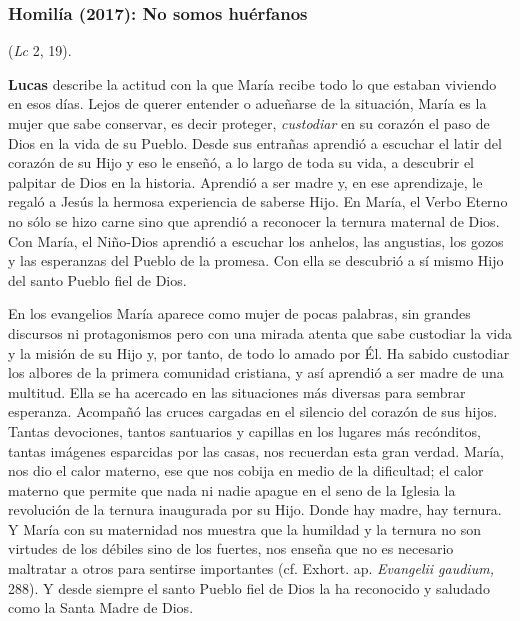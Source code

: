 \subsubsection{Homilía (2017): No somos huérfanos}


\begin{body}
	 (\emph{Lc} 2, 19). 
	
	 \textbf{Lucas} describe la actitud con la que María recibe todo lo que estaban viviendo en esos días. Lejos de querer entender o adueñarse de la situación, María es la mujer que sabe conservar, es decir proteger, \emph{custodiar} en su corazón el paso de Dios en la vida de su Pueblo. Desde sus entrañas aprendió a escuchar el latir del corazón de su Hijo y eso le enseñó, a lo largo de toda su vida, a descubrir el palpitar de Dios en la historia. Aprendió a ser madre y, en ese aprendizaje, le regaló a Jesús la hermosa experiencia de saberse Hijo. En María, el Verbo Eterno no sólo se hizo carne sino que aprendió a reconocer la ternura maternal de Dios. Con María, el Niño-Dios aprendió a escuchar los anhelos, las angustias, los gozos y las esperanzas del Pueblo de la promesa. Con ella se descubrió a sí mismo Hijo del santo Pueblo fiel de Dios.
	
	En los evangelios María aparece como mujer de pocas palabras, sin grandes discursos ni protagonismos pero con una mirada atenta que sabe custodiar la vida y la misión de su Hijo y, por tanto, de todo lo amado por Él. Ha sabido custodiar los albores de la primera comunidad cristiana, y así aprendió a ser madre de una multitud. Ella se ha acercado en las situaciones más diversas para sembrar esperanza. Acompañó las cruces cargadas en el silencio del corazón de sus hijos. Tantas devociones, tantos santuarios y capillas en los lugares más recónditos, tantas imágenes esparcidas por las casas, nos recuerdan esta gran verdad. María, nos dio el calor materno, ese que nos cobija en medio de la dificultad; el calor materno que permite que nada ni nadie apague en el seno de la Iglesia la revolución de la ternura inaugurada por su Hijo. Donde hay madre, hay ternura. Y María con su maternidad nos muestra que la humildad y la ternura no son virtudes de los débiles sino de los fuertes, nos enseña que no es necesario maltratar a otros para sentirse importantes (cf. Exhort. ap. \emph{Evangelii gaudium,} 288). Y desde siempre el santo Pueblo fiel de Dios la ha reconocido y saludado como la Santa Madre de Dios.
	

\end{body}
